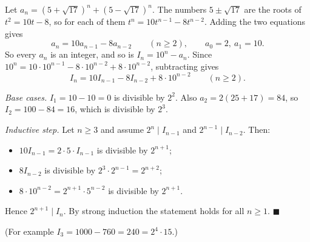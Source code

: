 Let $a_n=\left(5+\sqrt{17}\right)^n+\left(5-\sqrt{17}\right)^n$. The numbers $5\pm\sqrt{17}$ are the roots of $t^2=10t-8$, so for each of them $t^n=10t^{n-1}-8t^{n-2}$. Adding the two equations gives
\[a_n=10a_{n-1}-8a_{n-2}\qquad(n\ge2),\qquad a_0=2,\ a_1=10.\]
So every $a_n$ is an integer, and so is $I_n=10^n-a_n$. Since $10^n=10\cdot10^{n-1}-8\cdot10^{n-2}+8\cdot10^{n-2}$, subtracting gives
\[I_n=10I_{n-1}-8I_{n-2}+8\cdot10^{n-2}\qquad(n\ge2).\]

\emph{Base cases.} $I_1=10-10=0$ is divisible by $2^2$. Also $a_2=2(25+17)=84$, so $I_2=100-84=16$, which is divisible by $2^3$.

\emph{Inductive step.} Let $n\ge3$ and assume $2^{n}\mid I_{n-1}$ and $2^{n-1}\mid I_{n-2}$. Then:
\begin{itemize}
\item $10I_{n-1}=2\cdot5\cdot I_{n-1}$ is divisible by $2^{n+1}$;
\item $8I_{n-2}$ is divisible by $2^3\cdot2^{n-1}=2^{n+2}$;
\item $8\cdot10^{n-2}=2^{n+1}\cdot5^{n-2}$ is divisible by $2^{n+1}$.
\end{itemize}
Hence $2^{n+1}\mid I_n$. By strong induction the statement holds for all $n\ge1$. $\blacksquare$

(For example $I_3=1000-760=240=2^4\cdot15$.)
